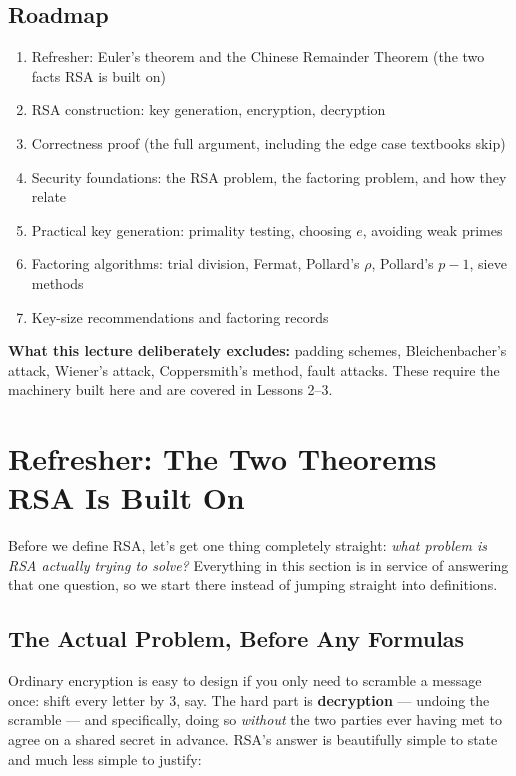 \vspace{0.5cm}
\subsection*{Roadmap}
\begin{enumerate}[label=(\arabic*)]
\item Refresher: Euler's theorem and the Chinese Remainder Theorem (the two facts RSA is built on)
\item RSA construction: key generation, encryption, decryption
\item Correctness proof (the full argument, including the edge case textbooks skip)
\item Security foundations: the RSA problem, the factoring problem, and how they relate
\item Practical key generation: primality testing, choosing $e$, avoiding weak primes
\item Factoring algorithms: trial division, Fermat, Pollard's $\rho$, Pollard's $p-1$, sieve methods
\item Key-size recommendations and factoring records
\end{enumerate}
\textbf{What this lecture deliberately excludes:} padding schemes, Bleichenbacher's attack, Wiener's attack, Coppersmith's method, fault attacks. These require the machinery built here and are covered in Lessons 2--3.

\newpage

\section{Refresher: The Two Theorems RSA Is Built On}

Before we define RSA, let's get one thing completely straight: \emph{what problem is RSA actually trying to solve?} Everything in this section is in service of answering that one question, so we start there instead of jumping straight into definitions.

\subsection{The Actual Problem, Before Any Formulas}

Ordinary encryption is easy to design if you only need to scramble a message once: shift every letter by 3, say. The hard part is \textbf{decryption} — undoing the scramble — and specifically, doing so \emph{without} the two parties ever having met to agree on a shared secret in advance. RSA's answer is beautifully simple to state and much less simple to justify:

